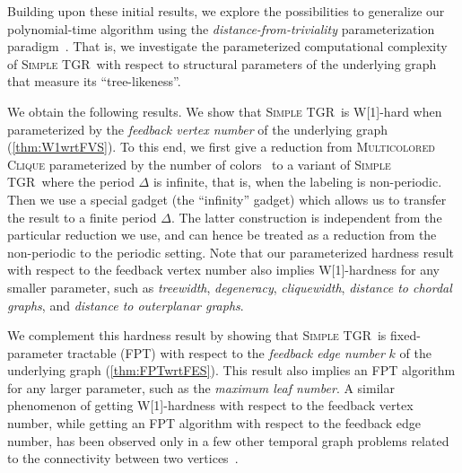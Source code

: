 \documentclass[a4paper,UKenglish,cleveref, autoref, thm-restate, anonymous]{lipics-v2021}
\newcommand{\deltaExact}{\textsc{Simple TGR}}
\begin{document}
Building upon these initial results, we explore the possibilities to generalize our polynomial-time algorithm using the \emph{distance-from-triviality} parameterization paradigm~\cite{FJR13,GHN04}. That is, we investigate the parameterized computational complexity of \deltaExact\ with respect to structural parameters of the underlying graph that measure its ``tree-likeness''.

We obtain the following results. We show that \deltaExact\ is W[1]-hard when parameterized by the \emph{feedback vertex number} of the underlying graph (\cref{thm:W1wrtFVS}). 
To this end, we first give a reduction from \textsc{Multicolored Clique} parameterized by the number of colors~\cite{fellows2009multipleinterval} to a variant of \deltaExact\ where the period $\Delta$ is infinite, that is, when the labeling is non-periodic. 
Then we use a special gadget (the ``infinity'' gadget) which allows us to transfer the result to a finite period $\Delta$. The latter construction is independent from the particular reduction we use, and can hence be treated as a reduction from the non-periodic to the periodic setting.
Note that our parameterized hardness result with respect to the feedback vertex number 
also implies W[1]-hardness for any smaller parameter, such as \emph{treewidth}, \emph{degeneracy}, \emph{cliquewidth}, 
\emph{distance to chordal graphs}, and \emph{distance to outerplanar graphs}.


We complement this hardness result by showing that \deltaExact\ is fixed-parameter tractable (FPT) with respect to the \emph{feedback edge number} $k$ of the underlying graph (\cref{thm:FPTwrtFES}). 
This result also implies an FPT algorithm for any larger parameter, such as the \emph{maximum leaf number}. 
A similar phenomenon of getting W[1]-hardness with respect to the feedback vertex number, while getting an FPT algorithm with respect to the feedback edge number, has been observed only in a few other temporal graph problems related to the connectivity between two vertices~\cite{casteigts2021finding,FMNR22a,EMM22}.
\end{document}
